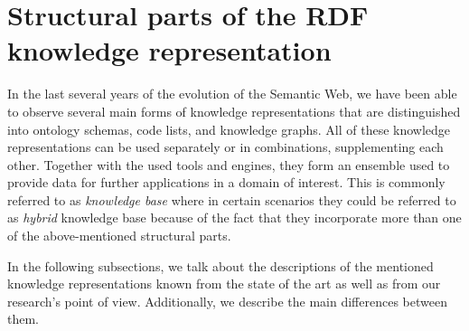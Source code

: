 \section{Structural parts of the RDF knowledge representation}
\label{sections/02-structural-parts}
In the last several years of the evolution of the Semantic Web, we have been able to observe several main forms of knowledge representations that are distinguished into ontology schemas, code lists, and knowledge graphs. All of these knowledge representations can be used separately or in combinations, supplementing each other. Together with the used tools and engines, they form an ensemble used to provide data for further applications in a domain of interest. This is commonly referred to as \textit{knowledge base} where in certain scenarios they could be referred to as \textit{hybrid} knowledge base because of the fact that they incorporate more than one of the above-mentioned structural parts.

In the following subsections, we talk about the descriptions of the mentioned knowledge representations known from the state of the art as well as from our research's point of view. Additionally, we describe the main differences between them.

